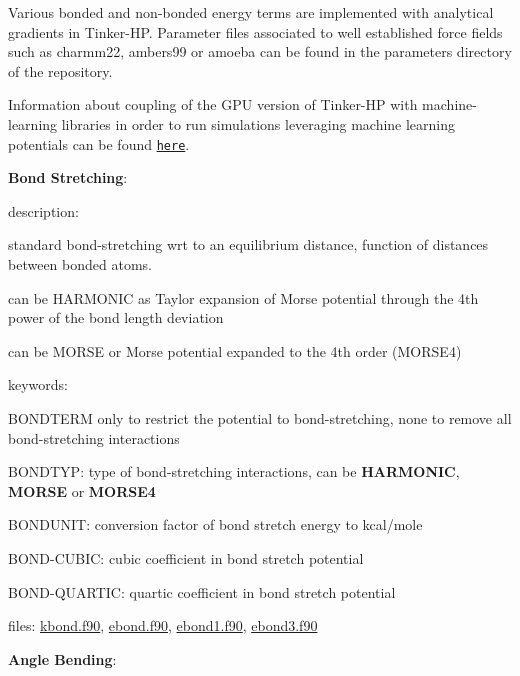 Various bonded and non-\/bonded energy terms are implemented with analytical gradients in Tinker-\/\-H\-P. Parameter files associated to well established force fields such as charmm22, ambers99 or amoeba can be found in the parameters directory of the repository.

Information about coupling of the G\-P\-U version of Tinker-\/\-H\-P with machine-\/learning libraries in order to run simulations leveraging machine learning potentials can be found \href{md_Deep-HP.html}{\tt here}.


\begin{DoxyItemize}
\item {\bfseries Bond Stretching}\-:
\begin{DoxyItemize}
\item description\-:
\begin{DoxyItemize}
\item standard bond-\/stretching wrt to an equilibrium distance, function of distances between bonded atoms.
\item can be H\-A\-R\-M\-O\-N\-I\-C as Taylor expansion of Morse potential through the 4th power of the bond length deviation
\item can be M\-O\-R\-S\-E or Morse potential expanded to the 4th order (M\-O\-R\-S\-E4)
\end{DoxyItemize}
\item keywords\-:
\begin{DoxyItemize}
\item B\-O\-N\-D\-T\-E\-R\-M only to restrict the potential to bond-\/stretching, none to remove all bond-\/stretching interactions
\item B\-O\-N\-D\-T\-Y\-P\-: type of bond-\/stretching interactions, can be {\bfseries H\-A\-R\-M\-O\-N\-I\-C}, {\bfseries M\-O\-R\-S\-E} or {\bfseries M\-O\-R\-S\-E4}
\item B\-O\-N\-D\-U\-N\-I\-T\-: conversion factor of bond stretch energy to kcal/mole
\item B\-O\-N\-D-\/\-C\-U\-B\-I\-C\-: cubic coefficient in bond stretch potential
\item B\-O\-N\-D-\/\-Q\-U\-A\-R\-T\-I\-C\-: quartic coefficient in bond stretch potential
\end{DoxyItemize}
\item files\-: \hyperlink{kbond_8f90}{kbond.\-f90}, \hyperlink{ebond_8f90}{ebond.\-f90}, \hyperlink{ebond1_8f90}{ebond1.\-f90}, \hyperlink{ebond3_8f90}{ebond3.\-f90}
\end{DoxyItemize}
\item {\bfseries Angle Bending}\-:

\end{DoxyItemize}
